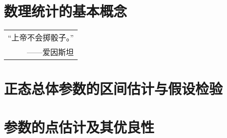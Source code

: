 \chapter{数理统计的基本概念}%

\begin{flushright}
    \begin{tabular}{r|||}
        “上帝不会掷骰子。”\\
        ——爱因斯坦
    \end{tabular}
\end{flushright}





\chapter{正态总体参数的区间估计与假设检验}%









\chapter{参数的点估计及其优良性}%





